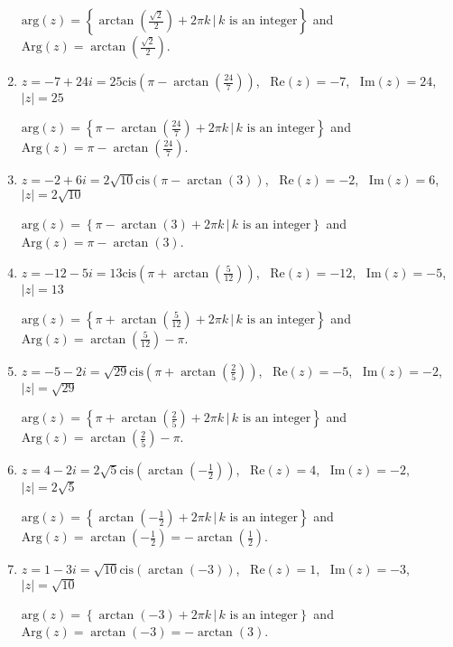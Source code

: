 \documentclass{ximera}
\begin{document}
\begin{enumerate}
$\text{arg}(z) = \left\{\arctan\left(\frac{\sqrt{2}}{2}\right) + 2\pi k \, | \, \text{$k$ is an integer} \right\}$ and $\text{Arg}(z) =\arctan\left(\frac{\sqrt{2}}{2}\right) $.

\item $z = -7 + 24i = 25\text{cis}\left(\pi - \arctan\left(\frac{24}{7}\right)\right)$, \, $\text{Re}(z) = -7$, \, $\text{Im}(z) = 24$, \, $|z| = 25$

$\text{arg}(z) = \left\{\pi - \arctan\left(\frac{24}{7}\right) + 2\pi k \, | \, \text{$k$ is an integer} \right\}$ and $\text{Arg}(z) =\pi - \arctan\left(\frac{24}{7}\right) $.

\item $z = -2 + 6i = 2\sqrt{10}\text{cis}\left(\pi - \arctan\left(3\right)\right)$, \, $\text{Re}(z) = -2$, \, $\text{Im}(z) = 6$, \, $|z| =2\sqrt{10}$

$\text{arg}(z) = \left\{\pi - \arctan\left(3\right) + 2\pi k \, | \, \text{$k$ is an integer} \right\}$ and $\text{Arg}(z) =\pi - \arctan\left(3\right) $.

\item $z = -12 -5i = 13\text{cis}\left(\pi + \arctan\left(\frac{5}{12}\right)\right)$, \, $\text{Re}(z) = -12$, \, $\text{Im}(z) = -5$, \, $|z| = 13$

$\text{arg}(z) = \left\{\pi +\arctan\left(\frac{5}{12}\right) + 2\pi k \, | \, \text{$k$ is an integer} \right\}$ and $\text{Arg}(z) =  \arctan\left(\frac{5}{12}\right) -\pi $.

\item $z = -5-2i = \sqrt{29}\text{cis}\left(\pi + \arctan\left(\frac{2}{5}\right)\right)$, \, $\text{Re}(z) = -5$, \, $\text{Im}(z) = -2$, \, $|z| = \sqrt{29}$

$\text{arg}(z) = \left\{\pi +\arctan\left(\frac{2}{5}\right) + 2\pi k \, | \, \text{$k$ is an integer} \right\}$ and $\text{Arg}(z) =  \arctan\left(\frac{2}{5}\right) -\pi $.

\item $z =4-2i = 2\sqrt{5}\text{cis}\left(\arctan\left(-\frac{1}{2}\right)\right)$, \, $\text{Re}(z) =4$, \, $\text{Im}(z) = -2$, \, $|z| = 2\sqrt{5}$

$\text{arg}(z) = \left\{\arctan\left(-\frac{1}{2}\right) + 2\pi k \, | \, \text{$k$ is an integer} \right\}$ and $\text{Arg}(z) = \arctan\left(-\frac{1}{2}\right) = -\arctan\left(\frac{1}{2}\right) $.

\item $z =1-3i = \sqrt{10}\text{cis}\left(\arctan\left(-3\right)\right)$, \, $\text{Re}(z) =1$, \, $\text{Im}(z) = -3$, \, $|z| =\sqrt{10}$

$\text{arg}(z) = \left\{\arctan\left(-3\right) + 2\pi k \, | \, \text{$k$ is an integer} \right\}$ and $\text{Arg}(z) =  \arctan\left(-3\right) = -\arctan(3)$.

\setcounter{HW}{\value{enumi}}

\end{enumerate}
\end{document}
